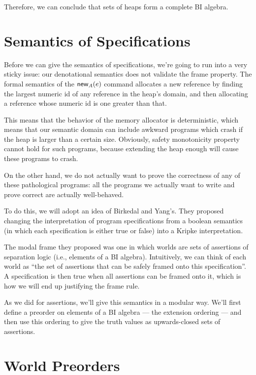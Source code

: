 Therefore, we can conclude that sets of heaps form a complete BI algebra. 

\section{Semantics of Specifications}

Before we can give the semantics of specifications, we're going to run
into a very sticky issue: our denotational semantics does not validate
the frame property. The formal semantics of the $\mathsf{new}_{A}(e)$
command allocates a new reference by finding the largest numeric id of
any reference in the heap's domain, and then allocating a reference
whose numeric id is one greater than that.

This means that the behavior of the memory allocator is deterministic,
which means that our semantic domain can include awkward programs
which crash if the heap is larger than a certain size. Obviously,
safety monotonicity property cannot hold for such programs, because
extending the heap enough will cause these programs to crash.  
 
On the other hand, we do not actually want to prove the correctness of
any of these pathological programs: all the programs we actually want
to write and prove correct are actually well-behaved.

To do this, we will adopt an idea of Birkedal and Yang's. They
proposed changing the interpretation of program specifications from a
boolean semantics (in which each specification is either true or
false) into a Kripke interpretation.

The modal frame they proposed was one in which worlds are sets of
assertions of separation logic (i.e., elements of a BI algebra).
Intuitively, we can think of each world as ``the set of assertions
that can be safely framed onto this specification''. A specification
is then true when all assertions can be framed onto it, which is how
we will end up justifying the frame rule.

As we did for assertions, we'll give this semantics in a modular
way. We'll first define a preorder on elements of a BI algebra --- the
extension ordering --- and then use this ordering to give the truth
values as upwards-closed sets of assertions.

\section{World Preorders}

